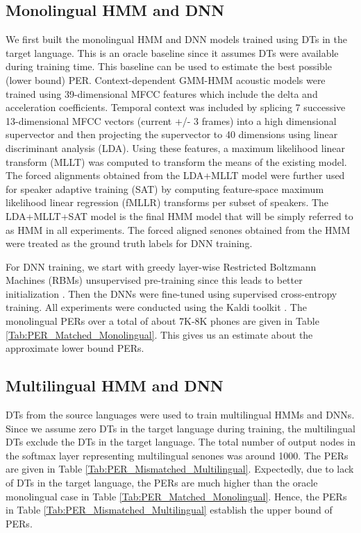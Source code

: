 \documentclass[a4paper]{article}
\begin{document}
\subsection{Monolingual HMM and DNN}
\label{sec:Monolingual HMM and DNN}
We first built the monolingual HMM and DNN models trained using DTs in the target language. This is an oracle baseline since it assumes DTs were available during training time. This baseline can be used to estimate the best possible (lower bound) PER.
Context-dependent GMM-HMM acoustic models were trained using 39-dimensional MFCC features which include the delta and acceleration coefficients. Temporal context was included by splicing 7 successive 13-dimensional MFCC vectors (current +/- 3 frames) into a high dimensional supervector and then projecting the supervector to 40 dimensions using linear discriminant analysis (LDA). Using these features, a maximum likelihood linear transform (MLLT) \cite{Gopinath-MLLT} was computed to transform the means of the existing model. The forced alignments obtained from the LDA+MLLT model were further used for speaker adaptive training (SAT) by computing feature-space maximum likelihood linear regression (fMLLR) transforms \cite{Gales-CMLLR} per subset of speakers. The LDA+MLLT+SAT model is the final HMM model that will be simply referred to as HMM in all experiments. The forced aligned senones obtained from the HMM were treated as the ground truth labels for DNN training. 

For DNN training, we start with greedy layer-wise Restricted Boltzmann Machines (RBMs) unsupervised pre-training since this leads to better initialization \cite{Bengio-Pretraining}. Then the DNNs were fine-tuned using supervised cross-entropy training.  All experiments were conducted using the Kaldi toolkit \cite{Povey-Kaldi}. The monolingual PERs over a total of about 7K-8K phones  are given in Table \ref{Tab:PER_Matched_Monolingual}. This gives us an estimate about the approximate lower bound PERs.

\subsection{Multilingual HMM and DNN}
\label{sec:Multilingual HMM and DNN}
DTs from the source languages were used to train multilingual HMMs and DNNs. Since we assume zero DTs in the target language during training, the multilingual DTs exclude the DTs in the target language.  The total number of output nodes in the softmax layer representing multilingual senones was around 1000.  The PERs are given in Table \ref{Tab:PER_Mismatched_Multilingual}. Expectedly, due to lack of DTs in the target language, the PERs are much higher than the oracle monolingual case in Table \ref{Tab:PER_Matched_Monolingual}. Hence, the PERs in Table \ref{Tab:PER_Mismatched_Multilingual} establish the upper bound of PERs.
\end{document}
